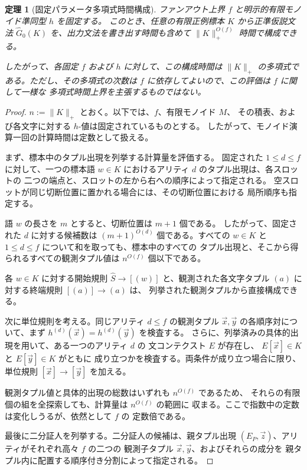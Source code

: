\documentclass[11pt,a4paper]{ltjsarticle}
\newtheorem{theorem}{定理}[section]
\theoremstyle{remark}
\newcommand{\tuple}[1]{\vec{#1}}
\begin{document}
\begin{theorem}[固定パラメータ多項式時間構成]
\label{thm:poly}
ファンアウト上界 \(f\) と明示的有限モノイド準同型 \(h\) を固定する。
このとき、任意の有限正例標本 \(K\) から正準仮説文法
\(\widehat{G}_0(K)\) を、出力文法を書き出す時間も含めて
\(\lVert K\rVert_+^{O(f)}\) 時間で構成できる。

したがって、各固定 \(f\) および \(h\) に対して、この構成時間は
\(\lVert K\rVert_+\) の多項式である。ただし、その多項式の次数は
\(f\) に依存してよいので、この評価は \(f\) に関して一様な
多項式時間上界を主張するものではない。
\end{theorem}

\begin{proof}
\(n:=\lVert K\rVert_+\) とおく。以下では、\(f\)、有限モノイド \(M\)、
その積表、および各文字に対する \(h\)-値は固定されているものとする。
したがって、モノイド演算一回の計算時間は定数として扱える。

まず、標本中のタプル出現を列挙する計算量を評価する。
固定された \(1\le d\le f\) に対して、一つの標本語
\(w\in K\) におけるアリティ \(d\) のタプル出現は、各スロットの
二つの端点と、スロットの左から右への順序によって指定される。
空スロットが同じ切断位置に置かれる場合には、その切断位置における
局所順序も指定する。

語 \(w\) の長さを \(m\) とすると、切断位置は \(m+1\) 個である。
したがって、固定された \(d\) に対する候補数は
\((m+1)^{O(d)}\) 個である。すべての \(w\in K\) と
\(1\le d\le f\) について和を取っても、標本中のすべての
タプル出現と、そこから得られるすべての観測タプル値は
\(n^{O(f)}\) 個以下である。

各 \(w\in K\) に対する開始規則
\(\widehat{S}\to[(w)]\) と、観測された各文字タプル
\((a)\) に対する終端規則 \([(a)]\to(a)\) は、
列挙された観測タプルから直接構成できる。

次に単位規則を考える。同じアリティ \(d\le f\) の観測タプル
\(\tuple{x},\tuple{y}\) の各順序対について、まず
\(h^{(d)}(\tuple{x})=h^{(d)}(\tuple{y})\) を検査する。
さらに、列挙済みの具体的出現を用いて、ある一つのアリティ \(d\) の
文コンテクスト \(E\) が存在し、
\(E[\tuple{x}]\in K\) と \(E[\tuple{y}]\in K\) がともに
成り立つかを検査する。両条件が成り立つ場合に限り、単位規則
\([\tuple{x}]\to[\tuple{y}]\) を加える。

観測タプル値と具体的出現の総数はいずれも \(n^{O(f)}\) であるため、
それらの有限個の組を全探索しても、計算量は \(n^{O(f)}\) の範囲に
収まる。ここで指数中の定数は変化しうるが、依然として \(f\) の
定数倍である。

最後に二分証人を列挙する。二分証人の候補は、親タプル出現
\((E_P,\tuple{z})\)、アリティがそれぞれ高々 \(f\) の二つの
観測子タプル \(\tuple{x},\tuple{y}\)、およびそれらの成分を
親タプル内に配置する順序付き分割によって指定される。


\end{proof}
\end{document}
